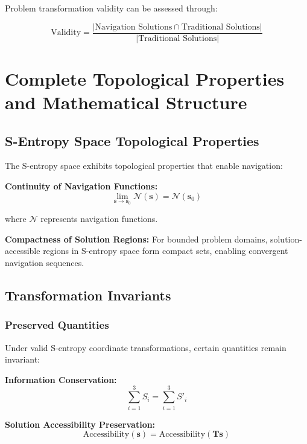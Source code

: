 \documentclass[11pt]{article}
\theoremstyle{definition}
\theoremstyle{remark}
\begin{document}
Problem transformation validity can be assessed through:

\begin{equation}
\text{Validity} = \frac{|\text{Navigation Solutions} \cap \text{Traditional Solutions}|}{|\text{Traditional Solutions}|}
\end{equation}

\section{Complete Topological Properties and Mathematical Structure}

\subsection{S-Entropy Space Topological Properties}

The S-entropy space exhibits topological properties that enable navigation:

\textbf{Continuity of Navigation Functions:}
\begin{equation}
\lim_{\mathbf{s} \to \mathbf{s}_0} \mathcal{N}(\mathbf{s}) = \mathcal{N}(\mathbf{s}_0)
\end{equation}

where $\mathcal{N}$ represents navigation functions.

\textbf{Compactness of Solution Regions:}
For bounded problem domains, solution-accessible regions in S-entropy space form compact sets, enabling convergent navigation sequences.

\subsection{Transformation Invariants}

\subsubsection{Preserved Quantities}

Under valid S-entropy coordinate transformations, certain quantities remain invariant:

\textbf{Information Conservation:}
\begin{equation}
\sum_{i=1}^{3} S_i = \sum_{i=1}^{3} S'_i
\end{equation}

\textbf{Solution Accessibility Preservation:}
\begin{equation}
\text{Accessibility}(\mathbf{s}) = \text{Accessibility}(\mathbf{T}\mathbf{s})
\end{equation}
\end{document}
